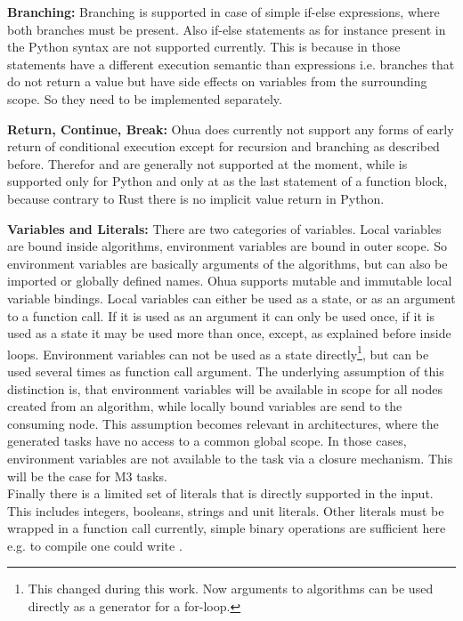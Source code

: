 \textbf{Branching:} Branching is supported in case of simple if-else expressions, where both branches must be present. Also if-else statements as for instance present in the Python syntax are not supported currently. This is because in those statements have a different execution semantic than expressions i.e. branches that do not return a value but have side effects on variables from the surrounding scope. So they need to be implemented separately.

\textbf{Return, Continue, Break:} Ohua does currently not support any forms of early return of conditional execution except for recursion and branching as described before. Therefor  and  are generally not supported at the moment, while  is supported only for Python and only at as the last statement of a function block, because contrary to Rust there is no implicit value return in Python. 

\textbf{Variables and Literals:} There are two categories of variables. Local variables are bound inside algorithms, environment variables are bound in outer scope. So environment variables are basically arguments of the algorithms, but can also be imported or globally defined names. Ohua supports mutable and immutable local variable bindings. Local variables can either be used as a state, or as an argument to a function call. If it is used as an argument it can only be used once, if it is used as a state it may be used more than once, except, as explained before inside loops. Environment variables can not be used as a state directly\footnote{This changed during this work. Now arguments to algorithms can be used directly as a generator for a for-loop.}, but can be used several times as function call argument. The underlying assumption of this distinction is, that environment variables will be available in scope for all nodes created from an algorithm, while locally bound variables are send to the consuming node. This assumption becomes relevant in architectures, where the generated tasks have no access to a common global scope. In those cases, environment variables are not available to the task via a closure mechanism. This will be the case for M3 tasks. \\
Finally there is a limited set of literals that is directly supported in the input. This includes integers, booleans, strings and unit literals. Other literals must be wrapped in a function call currently, simple binary operations are sufficient here e.g. to compile  one could write .

